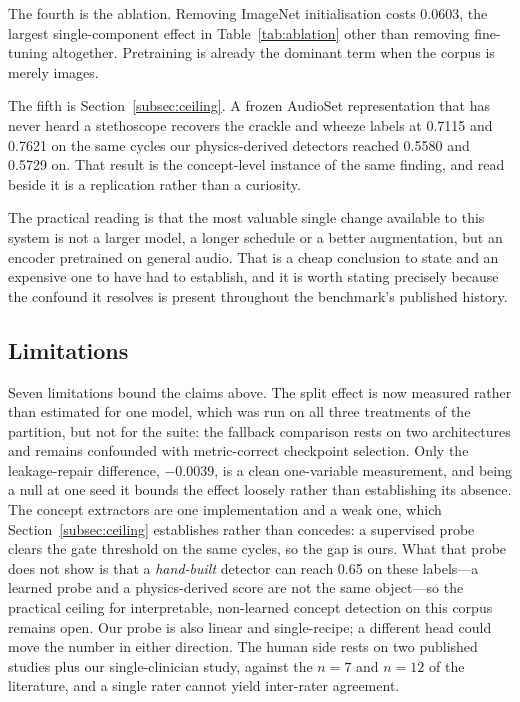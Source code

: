 \documentclass[journal,onecolumn]{IEEEtran}
\begin{document}
The fourth is the ablation. Removing ImageNet initialisation costs 0.0603, the largest
single-component effect in Table~\ref{tab:ablation} other than removing fine-tuning
altogether. Pretraining is already the dominant term when the corpus is merely images.

The fifth is Section~\ref{subsec:ceiling}. A frozen AudioSet representation that has never
heard a stethoscope recovers the crackle and wheeze labels at 0.7115 and 0.7621 on the
same cycles our physics-derived detectors reached 0.5580 and 0.5729 on. That result is the
concept-level instance of the same finding, and read beside \cite{frozenfm2025} it is a
replication rather than a curiosity.

The practical reading is that the most valuable single change available to this system is
not a larger model, a longer schedule or a better augmentation, but an encoder pretrained
on general audio. That is a cheap conclusion to state and an expensive one to have had to
establish, and it is worth stating precisely because the confound it resolves is present
throughout the benchmark's published history.

\subsection{Limitations}
\label{subsec:limitations}

Seven limitations bound the claims above. The split effect is now measured rather than
estimated for one model, which was run on all three treatments of the partition, but not
for the suite: the fallback comparison rests on two architectures and remains confounded
with metric-correct checkpoint selection. Only the leakage-repair difference, $-0.0039$,
is a clean one-variable measurement, and being a null at one seed it bounds the effect
loosely rather than establishing its absence. The concept extractors are one
implementation and a weak one, which Section~\ref{subsec:ceiling} establishes rather
than concedes: a supervised probe clears the gate threshold on the same cycles, so the
gap is ours. What that probe does not show is that a \emph{hand-built} detector can
reach 0.65 on these labels---a learned probe and a physics-derived score are not the
same object---so the practical ceiling for interpretable, non-learned concept detection
on this corpus remains open. Our probe is also linear and single-recipe; a different
head could move the number in either direction. The human side rests on two published
studies plus our single-clinician study, against the $n=7$ and $n=12$ of the literature,
and a single rater cannot yield inter-rater agreement.
\end{document}
